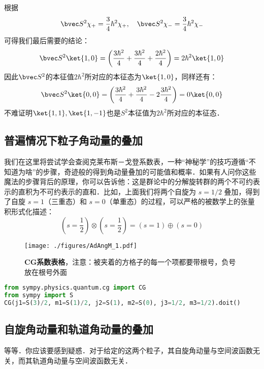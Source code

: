 根据
\begin{equation}
\bvec S^2\chi_+=\frac{3}{4}\hbar^2\chi_+,\quad \bvec S^2\chi_-=\frac{3}{4}\hbar^2\chi_-
\end{equation}
可得我们最后需要的结论：
\begin{equation}
\bvec S^2\ket{1,0}=\left(\frac{3\hbar^2}{4}+\frac{3\hbar^2}{4}+\frac{2\hbar^2}{4}\right)=2\hbar^2\ket{1,0}
\end{equation}
因此$\bvec S^2$的本征值$2\hbar^2$所对应的本征态为$\ket{1,0}$，同样还有：
\begin{equation}
\bvec S^2\ket{0,0}=\left(\frac{3\hbar^2}{4}+\frac{3\hbar^2}{4}-2\frac{3\hbar^2}{4}\right)=0\ket{0,0}
\end{equation}
不难证明$\ket{1,1},\ket{1,-1}$也是$S^2$本征值为$2\hbar^2$所对应的本征态．
\subsection{普遍情况下粒子角动量的叠加}
我们在这里将尝试学会查阅克莱布斯－戈登系数表，一种“神秘学”的技巧遵循“不知道为啥”的步骤，奇迹般的得到角动量叠加的可能值和概率．如果有人问你这些魔法的步骤背后的原理，你可以告诉他：这是群论中的分解旋转群的两个不可约表示的直积为不可约表示的直和．比如，上面我们将两个自旋为 $s=1/2$ 叠加，得到了自旋 $s=1$（三重态）和 $s=0$（单重态）的过程，可以严格的被数学上的张量积形式化描述：
\begin{equation}
(s=\frac{1}{2})\otimes(s=\frac{1}{2})=(s=1)\oplus (s=0)
\end{equation}


\begin{figure}[ht]
\centering
\texttt{[image: ./figures/AdAngM\_1.pdf]}
\caption{\textbf{CG系数表格}，注意：被夹着的方格子的每一个项都要带根号，负号放在根号外面} \label{AdAngM_fig1}
\end{figure}
\begin{lstlisting}[language=python]
from sympy.physics.quantum.cg import CG
from sympy import S
CG(j1=S(3)/2, m1=S(1)/2, j2=S(1), m2=S(0), j3=1/2, m3=1/2).doit()
\end{lstlisting}

\subsection{自旋角动量和轨道角动量的叠加}
等等．你应该要感到疑惑．对于给定的这两个粒子，其自旋角动量与空间波函数无关，而其轨道角动量与空间波函数无关．
